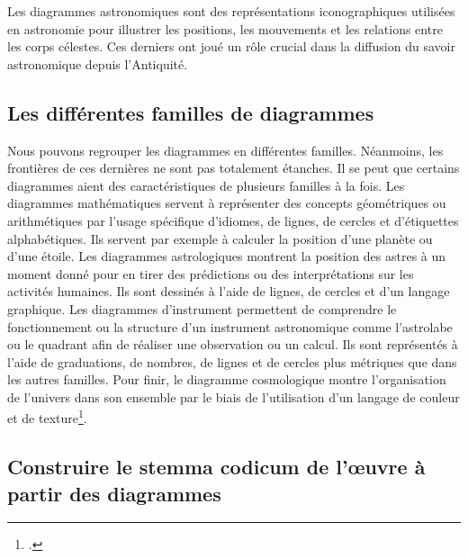Les diagrammes astronomiques sont des représentations iconographiques utilisées en astronomie pour illustrer les positions, les mouvements et les relations entre les corps célestes.  Ces derniers ont joué un rôle crucial dans la diffusion du savoir astronomique depuis l'Antiquité. 

\subsection{Les différentes familles de diagrammes}
Nous pouvons regrouper les diagrammes en différentes familles. Néanmoins, les frontières de ces dernières ne sont pas totalement étanches. Il se peut que certains diagrammes aient des caractéristiques de plusieurs familles à la fois. Les diagrammes mathématiques servent à représenter des concepts géométriques ou arithmétiques par l'usage spécifique d'idiomes, de lignes, de cercles et d'étiquettes alphabétiques. Ils servent par exemple à calculer la position d'une planète ou d'une étoile. Les diagrammes astrologiques montrent la position des astres à un moment donné pour en tirer des prédictions ou des interprétations sur les activités humaines. Ils sont dessinés à l'aide de lignes, de cercles et d'un langage graphique. Les diagrammes d'instrument permettent de comprendre le fonctionnement ou la structure d'un instrument astronomique comme l'astrolabe ou le quadrant afin de réaliser une observation ou un calcul. Ils sont représentés à l'aide de graduations, de nombres, de lignes et de cercles plus métriques que dans les autres familles. Pour finir, le diagramme cosmologique montre l'organisation de l'univers dans son ensemble par le biais de l'utilisation d'un langage de couleur et de texture\footcite{Conference2025Long2025}.



\subsection{Construire le stemma codicum de l'œuvre à partir des diagrammes}

